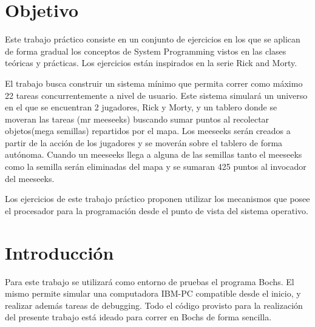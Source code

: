 \documentclass[a4paper]{article}
\begin{document}
\thispagestyle{empty}


\maketitle
\newpage


\thispagestyle{empty}
\vspace{3cm}
\tableofcontents
\newpage


\newpage

\section{Objetivo}

Este trabajo pr\'actico consiste en un conjunto de ejercicios en los que se aplican de forma gradual los conceptos de System Programming vistos en las clases te\'oricas y pr\'acticas. Los ejercicios est\'an inspirados en la serie Rick and Morty. 

El trabajo busca construir un sistema m\'inimo que permita correr como m\'aximo 22 tareas concurrentemente a nivel de usuario. Este sistema simulará un universo en el que se encuentran 2 jugadores, Rick y Morty, y un tablero donde se moveran las tareas (mr meeseeks) buscando sumar puntos al recolectar objetos(mega semillas) repartidos por el mapa. Los meeseeks serán creados a partir de la acción de los jugadores y se moverán sobre el tablero de forma autónoma. Cuando un meeseeks llega a alguna de las semillas tanto el meeseeks como la semilla serán eliminadas del mapa y se sumaran 425 puntos al invocador del meeseeks.

Los ejercicios de este trabajo práctico proponen utilizar los mecanismos que posee el procesador
para la programación desde el punto de vista del sistema operativo.

\section{Introducción}

Para este trabajo se utilizará como entorno de pruebas el programa Bochs. El mismo
permite simular una computadora IBM-PC compatible desde el inicio, y realizar además
tareas de debugging. Todo el código provisto para la realización del presente trabajo está
ideado para correr en Bochs de forma sencilla.
\end{document}
